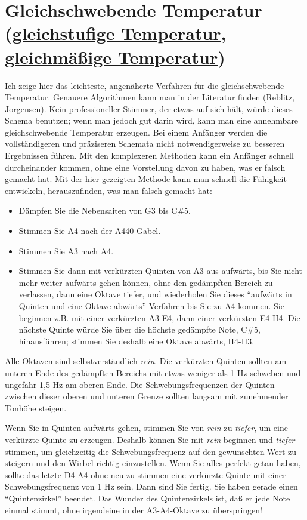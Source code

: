 \hypertarget{c2_6d}{}
\section{Gleichschwebende Temperatur (\hyperref[et]{gleichstufige Temperatur, gleichmäßige Temperatur})}
\label{c2_6_et}


Ich zeige hier das leichteste, angenäherte Verfahren für die gleichschwebende Temperatur.
Genauere Algorithmen kann man in der Literatur finden (Reblitz, Jorgensen).
Kein professioneller Stimmer, der etwas auf sich hält, würde dieses Schema benutzen; wenn man jedoch gut darin wird, kann man eine annehmbare gleichschwebende Temperatur erzeugen.
Bei einem Anfänger werden die vollständigeren und präziseren Schemata nicht notwendigerweise zu besseren Ergebnissen führen.
Mit den komplexeren Methoden kann ein Anfänger schnell durcheinander kommen, ohne eine Vorstellung davon zu haben, was er falsch gemacht hat.
Mit der hier gezeigten Methode kann man schnell die Fähigkeit entwickeln, herauszufinden, was man falsch gemacht hat:

\begin{itemize} 
 \item Dämpfen Sie die Nebensaiten von G3 bis C\#5.
 \item Stimmen Sie A4 nach der A440 Gabel.
 \item Stimmen Sie A3 nach A4.
 \item Stimmen Sie dann mit verkürzten Quinten von A3 aus aufwärts, bis Sie nicht mehr weiter aufwärts gehen können, ohne den gedämpften Bereich zu verlassen, dann eine Oktave tiefer, und wiederholen Sie dieses \enquote{aufwärts in Quinten und eine Oktave abwärts}-Verfahren bis Sie zu A4 kommen.
Sie beginnen z.B. mit einer verkürzten A3-E4, dann einer verkürzten E4-H4.
Die nächste Quinte würde Sie über die höchste gedämpfte Note, C\#5, hinausführen; stimmen Sie deshalb eine Oktave abwärts, H4-H3.
\end{itemize}

Alle Oktaven sind selbstverständlich \textit{rein}.
Die verkürzten Quinten sollten am unteren Ende des gedämpften Bereichs mit etwas weniger als 1 Hz schweben und ungefähr 1,5 Hz am oberen Ende.
Die Schwebungsfrequenzen der Quinten zwischen dieser oberen und unteren Grenze sollten langsam mit zunehmender Tonhöhe steigen.

Wenn Sie in Quinten aufwärts gehen, stimmen Sie von \textit{rein} zu \textit{tiefer}, um eine verkürzte Quinte zu erzeugen.
Deshalb können Sie mit \textit{rein} beginnen und \textit{tiefer} stimmen, um gleichzeitig die Schwebungsfrequenz auf den gewünschten Wert zu steigern und \hyperref[c2_5_wirb]{den Wirbel richtig einzustellen}.
Wenn Sie alles perfekt getan haben, sollte das letzte D4-A4 ohne neu zu stimmen eine verkürzte Quinte mit einer Schwebungsfrequenz von 1 Hz sein.
Dann sind Sie fertig.
Sie haben gerade einen \enquote{Quintenzirkel} beendet.
Das Wunder des Quintenzirkels ist, daß er jede Note einmal stimmt, ohne irgendeine in der A3-A4-Oktave zu überspringen!

